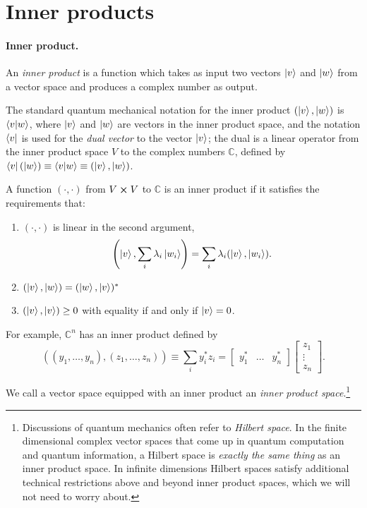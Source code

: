 \section{Inner products}

\paragraph{Inner product.} An \emph{inner product} is a function which takes as
input two vectors $\ket{v}$ and $\ket{w}$ from a vector space and produces a
complex number as output.

The standard quantum mechanical notation for the inner product $(\ket{v},
\ket{w})$ is $\braket{v}{w}$, where $\ket{v}$ and $\ket{w}$ are vectors in the
inner product space, and the notation $\bra{v}$ is used for the \emph{dual
vector} to the vector $\ket{v}$; the dual is a linear operator from the inner
product space $V$ to the complex numbers $\mathbb{C}$, defined by
$\bra{v}(\ket{w}) \equiv \braket{v}{w} \equiv (\ket{v}, \ket{w})$.

A function $(\cdot, \cdot)$ from $V \cross V$ to $\mathbb{C}$ is an inner
product if it satisfies the requirements that: \begin{enumerate}
  \item $(\cdot, \cdot)$ is linear in the second argument, \begin{equation}
      \left(\ket{v}, \sum_i \lambda_i\ket{w_i}\right) = \sum_i
      \lambda_i(\ket{v}, \ket{w_i}).
    \end{equation}
  \item $(\ket{v}, \ket{w}) = (\ket{w}, \ket{v})^*$
  \item $(\ket{v}, \ket{v}) \geq 0$ with equality if and only if $\ket{v} = 0$.
\end{enumerate}

For example, $\mathbb{C}^n$ has an inner product defined by \begin{equation}
  ((y_1, \ldots, y_n), (z_1, \ldots, z_n)) \equiv \sum_i y_i^*z_i =
    \begin{bmatrix}y_1^* & \dots & y_n^*\end{bmatrix}
    \begin{bmatrix}z_1 \\ \vdots \\ z_n\end{bmatrix}.
\end{equation}

We call a vector space equipped with an inner product an \emph{inner product
space}.\footnote{Discussions of quantum mechanics often refer to \emph{Hilbert
space}. In the finite dimensional complex vector spaces that come up in quantum
computation and quantum information, a Hilbert space is \emph{exactly the same
thing} as an inner product space. In infinite dimensions Hilbert spaces satisfy
additional technical restrictions above and beyond inner product spaces, which
we will not need to worry about.}

